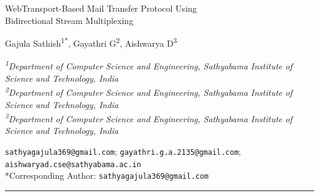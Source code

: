 \documentclass[10pt,a4paper]{article}
\begin{document}
\begin{center}
{\fontsize{24pt}{28pt}\selectfont
WebTransport-Based Mail Transfer Protocol Using\\
Bidirectional Stream Multiplexing
}

\vspace{6pt}

{\fontsize{11pt}{13pt}\selectfont
Gajula Sathish\textsuperscript{1*},
Gayathri G\textsuperscript{2},
Aishwarya D\textsuperscript{3}
}

\vspace{6pt}

{\fontsize{10pt}{12pt}\selectfont\itshape
\textsuperscript{1}Department of Computer Science and Engineering, Sathyabama Institute of Science and Technology, India \\
\textsuperscript{2}Department of Computer Science and Engineering, Sathyabama Institute of Science and Technology, India \\
\textsuperscript{3}Department of Computer Science and Engineering, Sathyabama Institute of Science and Technology, India
}

\vspace{6pt}

{\fontsize{9pt}{11pt}\selectfont
\texttt{sathyagajula369@gmail.com};
\texttt{gayathri.g.a.2135@gmail.com};
\texttt{aishwaryad.cse@sathyabama.ac.in} \\
*Corresponding Author: \texttt{sathyagajula369@gmail.com}
}
\end{center}

\vspace{2pt}
\hrule
\vspace{2pt}
\end{document}

